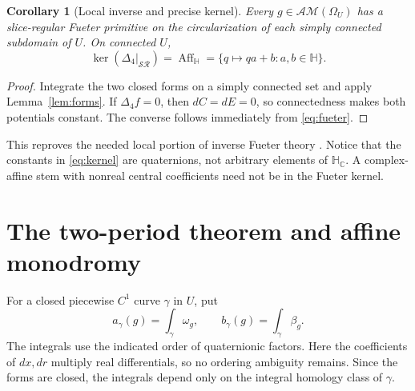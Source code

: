 \documentclass[11pt,a4paper]{article}
\numberwithin{equation}{section}
\newtheorem{corollary}[theorem]{Corollary}
\theoremstyle{definition}
\theoremstyle{remark}
\newcommand{\C}{\mathbb C}
\newcommand{\HH}{\mathbb H}
\newcommand{\HC}{\mathbb H_{\C}}
\newcommand{\SR}{\mathcal{SR}}
\newcommand{\AM}{\mathcal{AM}}
\newcommand{\Aff}{\operatorname{Aff}_{\HH}}
\newcommand{\Fu}{\Delta_4}
\begin{document}
\begin{corollary}[Local inverse and precise kernel]\label{cor:local}
Every $g\in\AM(\Omega_U)$ has a slice-regular Fueter primitive on the
circularization of each simply connected subdomain of $U$.
On connected $U$,
\begin{equation}
 \ker(\Fu|_{\SR})=\Aff
 =\{q\mapsto qa+b:a,b\in\HH\}.\label{eq:kernel}
\end{equation}
\end{corollary}
\begin{proof}
Integrate the two closed forms on a simply connected set and apply
Lemma~\ref{lem:forms}. If $\Fu f=0$, then $dC=dE=0$, so connectedness
makes both potentials constant. The converse follows immediately from
\eqref{eq:fueter}.
\end{proof}
This reproves the needed local portion of inverse Fueter theory
\cite{CSS,CPSS,Perotti}. Notice that the constants in \eqref{eq:kernel}
are quaternions, not arbitrary elements of $\HC$. A complex-affine stem
with nonreal central coefficients need not be in the Fueter kernel.

\section{The two-period theorem and affine monodromy}
\label{sec:period}
For a closed piecewise $C^1$ curve $\gamma$ in $U$, put
\begin{equation}
 a_\gamma(g)=\int_\gamma\omega_g,\qquad
 b_\gamma(g)=\int_\gamma\beta_g.\label{eq:periods}
\end{equation}
The integrals use the indicated order of quaternionic factors. Here the
coefficients of $dx,dr$ multiply real differentials, so no ordering ambiguity
remains. Since the forms are closed, the integrals depend only on the
integral homology class of $\gamma$.
\end{document}
